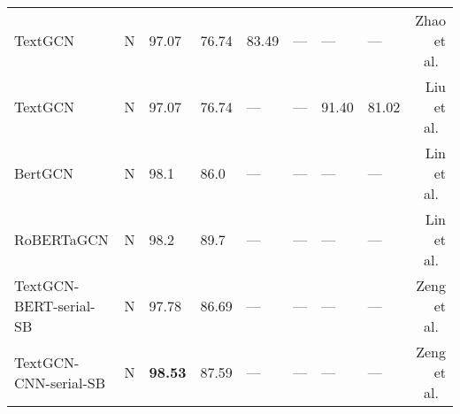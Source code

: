 \documentclass[runningheads]{llncs}
\begin{document}
\begin{table*}[!ht]
\begin{threeparttable}
{\begin{tabular}{lcllllllr}
            TextGCN                                 & N                   & 97.07            & 76.74          & 83.49                             & ---              & ---           & ---            & Zhao et al.~\cite{zhao2021sequential}      \\
            TextGCN                                 & N                   & 97.07            & 76.74          & ---                               & ---              & 91.40         & 81.02          & Liu et al.~\cite{liu2021deep}             \\
            BertGCN                                 & N                   & 98.1             & 86.0           & ---                               & ---              & ---           & ---            & Lin et al.~\cite{lin2021bertgcn}          \\
            RoBERTaGCN                              & N                   & 98.2             & 89.7           & ---                               & ---              & ---           & ---            & Lin et al.~\cite{lin2021bertgcn}          \\
            TextGCN-BERT-serial-SB                  & N                   & 97.78            & 86.69          & ---                               & ---              & ---           & ---            & Zeng et al.~\cite{zeng2022simplified}      \\
            TextGCN-CNN-serial-SB                   & N                   & \textbf{98.53}   & 87.59          & ---                               & ---              & ---           & ---            & Zeng et al.~\cite{zeng2022simplified}      \\
            \bottomrule
        \end{tabular}
        } 
        

\end{threeparttable}
\end{table*}
\end{document}
